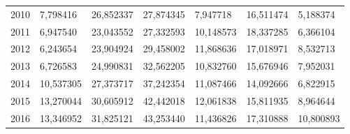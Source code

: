 \begin{table}
\begin{tabular}{p{1cm}p{2cm}p{2cm}p{2cm}p{2cm}p{2cm}p{2cm}}
 2010 &     7,798416 &            26,852337 &            27,874345 &       7,947718 &                                          16,511474 &                              5,188374 \\
 2011 &     6,947540 &            23,043552 &            27,332593 &      10,148573 &                                          18,337285 &                              6,366104 \\
 2012 &     6,243654 &            23,904924 &            29,458002 &      11,868636 &                                          17,018971 &                              8,532713 \\
 2013 &     6,726583 &            24,990831 &            32,562205 &      10,832760 &                                          15,676946 &                              7,952031 \\
 2014 &    10,537305 &            27,373717 &            37,242354 &      11,087466 &                                          14,092666 &                              6,822915 \\
 2015 &    13,270044 &            30,605912 &            42,442018 &      12,061838 &                                          15,811935 &                              8,964644 \\
 2016 &    13,346952 &            31,825121 &            43,253440 &      11,436826 &                                          17,310888 &                             10,800893 \\
\bottomrule
\end{tabular}
\end{table}
